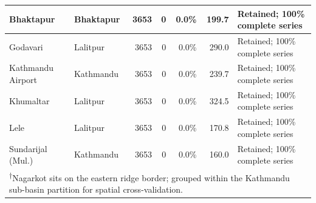 \documentclass[conference]{IEEEtran}
\begin{document}
\begin{table}[!tbp]
{\begin{tabularx}{\textwidth}{|l|l|r|r|r|r|X|}
Bhaktapur & Bhaktapur & 3653 & 0 & 0.0\% & 199.7 & Retained; 100\% complete series \\ \hline
Godavari & Lalitpur & 3653 & 0 & 0.0\% & 290.0 & Retained; 100\% complete series \\ \hline
Kathmandu Airport & Kathmandu & 3653 & 0 & 0.0\% & 239.7 & Retained; 100\% complete series \\ \hline
Khumaltar & Lalitpur & 3653 & 0 & 0.0\% & 324.5 & Retained; 100\% complete series \\ \hline
Lele & Lalitpur & 3653 & 0 & 0.0\% & 170.8 & Retained; 100\% complete series \\ \hline
Sundarijal (Mul.) & Kathmandu & 3653 & 0 & 0.0\% & 160.0 & Retained; 100\% complete series \\
\hline
\multicolumn{7}{|l|}{\scriptsize \textsuperscript{$\dagger$}Nagarkot sits on the eastern ridge border; grouped within the Kathmandu sub-basin partition for spatial cross-validation.} \\
\hline
\end{tabularx}%
}
\end{table}
\end{document}
